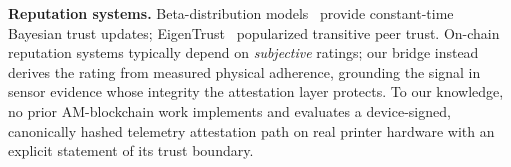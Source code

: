 \textbf{Reputation systems.}
Beta-distribution models~\cite{josang2002beta, josang2007survey} provide
constant-time Bayesian trust updates; EigenTrust~\cite{kamvar2003eigentrust}
popularized transitive peer trust.  On-chain reputation systems typically
depend on \emph{subjective} ratings; our bridge instead derives the rating
from measured physical adherence, grounding the signal in sensor evidence
whose integrity the attestation layer protects.  To our knowledge, no
prior AM-blockchain work implements and evaluates a device-signed,
canonically hashed telemetry attestation path on real printer hardware
with an explicit statement of its trust boundary.
